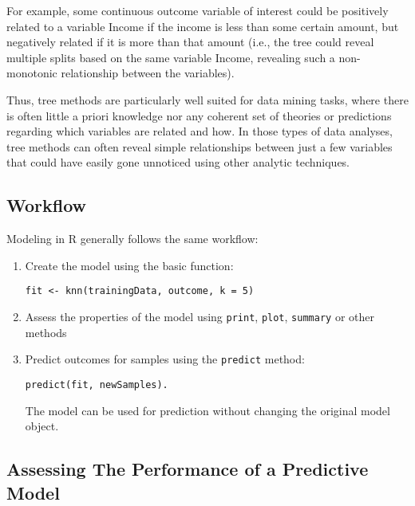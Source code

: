 \documentclass[11pt]{article} %
\begin{document}
For example, some continuous outcome variable of interest could be positively related to a variable Income if the income is less than some certain amount, but negatively related if it is more than that amount (i.e., the tree could reveal multiple splits based on the same variable Income, revealing such a non-monotonic relationship between the variables). 

Thus, tree methods are particularly well suited for data mining tasks, where there is often little a priori knowledge nor any coherent set of theories or predictions regarding which variables are related and how. In those types of data analyses, tree methods can often reveal simple relationships between just a few variables that could have easily gone unnoticed using other analytic techniques.

\newpage

\subsection{Workflow}
Modeling in R generally follows the same workflow:

\begin{enumerate} 
\item Create the model using the basic function:
\begin{verbatim}
fit <- knn(trainingData, outcome, k = 5)
\end{verbatim}
\item Assess the properties of the model using \texttt{print}, \texttt{plot}, \texttt{summary} or
other methods
\item  Predict outcomes for samples using the \texttt{predict} method:
\begin{verbatim}
predict(fit, newSamples).
\end{verbatim}
The model can be used for prediction without changing the original model
object.
\end{enumerate}


% 




\subsection{Assessing The Performance of a Predictive Model}
\end{document}
